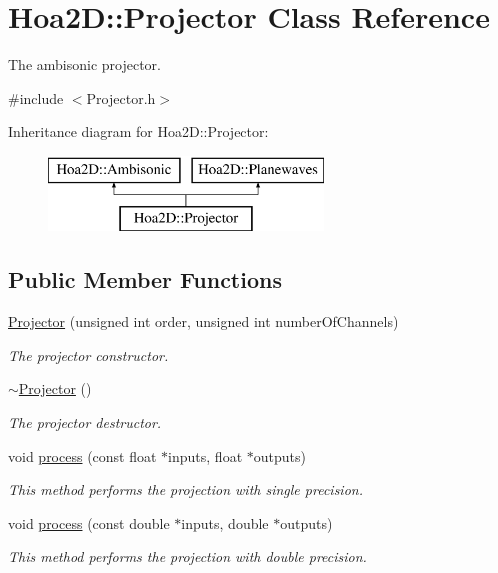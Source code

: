 \hypertarget{class_hoa2_d_1_1_projector}{\section{Hoa2\-D\-:\-:Projector Class Reference}
\label{class_hoa2_d_1_1_projector}
}


The ambisonic projector.  




{\ttfamily \#include $<$Projector.\-h$>$}

Inheritance diagram for Hoa2\-D\-:\-:Projector\-:\begin{figure}[H]
\begin{center}
\leavevmode
\includegraphics[height=2.000000cm]{class_hoa2_d_1_1_projector}
\end{center}
\end{figure}
\subsection*{Public Member Functions}
\begin{DoxyCompactItemize}
\item 
\hyperlink{class_hoa2_d_1_1_projector_a73b651a38b0680e6da45242073af54b7}{Projector} (unsigned int order, unsigned int number\-Of\-Channels)
\begin{DoxyCompactList}\small\item\em The projector constructor. \end{DoxyCompactList}\item 
\hyperlink{class_hoa2_d_1_1_projector_a7a93c4c33578b5f09636790a048c1351}{$\sim$\-Projector} ()
\begin{DoxyCompactList}\small\item\em The projector destructor. \end{DoxyCompactList}\item 
void \hyperlink{class_hoa2_d_1_1_projector_a3c4e52a53212701d92d5d5bff7af225b}{process} (const float $\ast$inputs, float $\ast$outputs)
\begin{DoxyCompactList}\small\item\em This method performs the projection with single precision. \end{DoxyCompactList}\item 
void \hyperlink{class_hoa2_d_1_1_projector_a60fe345d15f928b55a3755edb6f5026c}{process} (const double $\ast$inputs, double $\ast$outputs)
\begin{DoxyCompactList}\small\item\em This method performs the projection with double precision. \end{DoxyCompactList}\end{DoxyCompactItemize}


